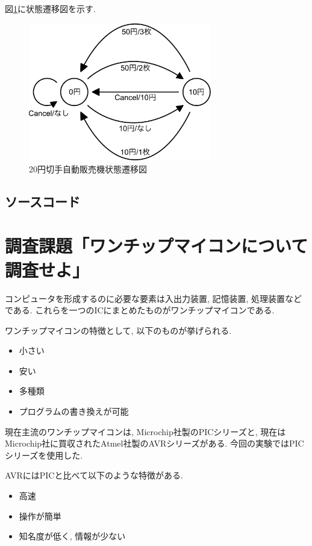 \documentclass[titlepage]{jsarticle}
\begin{document}
    図\ref{fig:本番状態遷移図}に状態遷移図を示す.

    \begin{figure}[ht]
        \centering
        \includegraphics[width=8cm]{images/honban.pdf}
        \caption{20円切手自動販売機状態遷移図}
        \label{fig:本番状態遷移図}
    \end{figure}

    \subsection{ソースコード}
    
\section{調査課題「ワンチップマイコンについて調査せよ」}
    コンピュータを形成するのに必要な要素は入出力装置, 記憶装置, 処理装置などである.
    これらを一つのICにまとめたものがワンチップマイコンである.

    ワンチップマイコンの特徴として, 以下のものが挙げられる.

    \begin{itemize}
        \item 小さい
        \item 安い
        \item 多種類
        \item プログラムの書き換えが可能
    \end{itemize}

    現在主流のワンチップマイコンは, Microchip社製のPICシリーズと,
    現在はMicrochip社に買収されたAtmel社製のAVRシリーズがある.
    今回の実験ではPICシリーズを使用した.

    AVRにはPICと比べて以下のような特徴がある.

    \begin{itemize}
        \item 高速
        \item 操作が簡単
        \item 知名度が低く, 情報が少ない
    \end{itemize}
\end{document}
